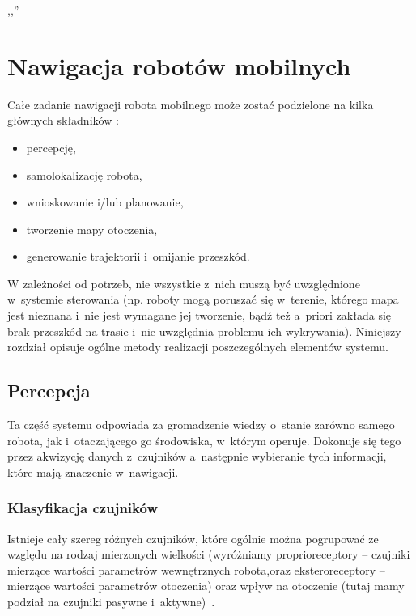 

\begin{savequote}[70mm]
,,''
\qauthor{}
\end{savequote}

\chapter{Nawigacja robotów mobilnych}
\label{chap:nawigacja}

Całe zadanie nawigacji robota mobilnego może zostać podzielone na kilka głównych
składników \cite[cz.~9]{szynkiewiczWR}:

\begin{itemize}
  \item percepcję,
  \item samolokalizację robota,
  \item wnioskowanie i/lub planowanie,
  \item tworzenie mapy otoczenia,
  \item generowanie trajektorii i~omijanie przeszkód.
\end{itemize}

W zależności od potrzeb, nie wszystkie z~nich muszą być uwzględnione w~systemie
sterowania (np. roboty mogą poruszać się w~terenie, którego mapa jest nieznana
i~nie jest wymagane jej tworzenie, bądź też a~priori zakłada się brak
przeszkód na trasie i~nie uwzględnia problemu ich wykrywania). Niniejszy
rozdział opisuje ogólne metody realizacji poszczególnych elementów systemu.

\section{Percepcja}

Ta część systemu odpowiada za gromadzenie wiedzy o~stanie zarówno samego robota,
jak i~otaczającego go środowiska, w~którym operuje. Dokonuje się tego przez
akwizycję danych z~czujników a~następnie wybieranie tych informacji, które mają
znaczenie w~nawigacji.

\subsection{Klasyfikacja czujników}

Istnieje cały szereg różnych
czujników, które ogólnie można pogrupować ze względu na rodzaj mierzonych
wielkości (wyróżniamy proprioreceptory -- czujniki mierzące wartości parametrów
wewnętrznych robota,oraz eksteroreceptory -- mierzące wartości parametrów
otoczenia) oraz wpływ na otoczenie (tutaj mamy podział na czujniki pasywne 
i~aktywne)~\cite{siegwart}.


